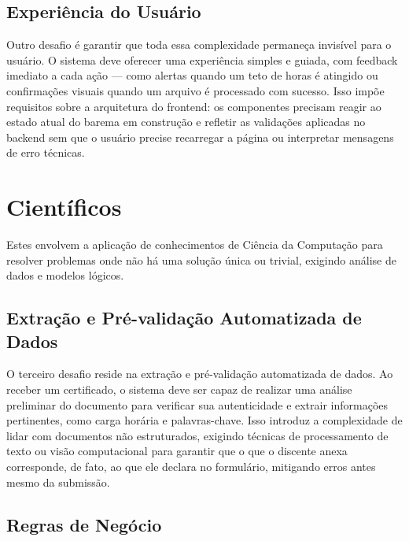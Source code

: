 \subsection{Experiência do Usuário}

Outro desafio é garantir que toda essa complexidade permaneça invisível para o usuário. O sistema deve oferecer uma experiência simples e guiada, com feedback imediato a cada ação — como alertas quando um teto de horas é atingido ou confirmações visuais quando um arquivo é processado com sucesso. Isso impõe requisitos sobre a arquitetura do frontend: os componentes precisam reagir ao estado atual do barema em construção e refletir as validações aplicadas no backend sem que o usuário precise recarregar a página ou interpretar mensagens de erro técnicas.

\section{Científicos}

Estes envolvem a aplicação de conhecimentos de Ciência da Computação para resolver problemas onde não há uma solução única ou trivial, exigindo análise de dados e modelos lógicos.


\subsection{Extração e Pré-validação Automatizada de Dados}

O terceiro desafio reside na extração e pré-validação automatizada de dados. Ao receber um certificado, o sistema deve ser capaz de realizar uma análise preliminar do documento para verificar sua autenticidade e extrair informações pertinentes, como carga horária e palavras-chave. Isso introduz a complexidade de lidar com documentos não estruturados, exigindo técnicas de processamento de texto ou visão computacional para garantir que o que o discente anexa corresponde, de fato, ao que ele declara no formulário, mitigando erros antes mesmo da submissão.


\subsection{Regras de Negócio}

